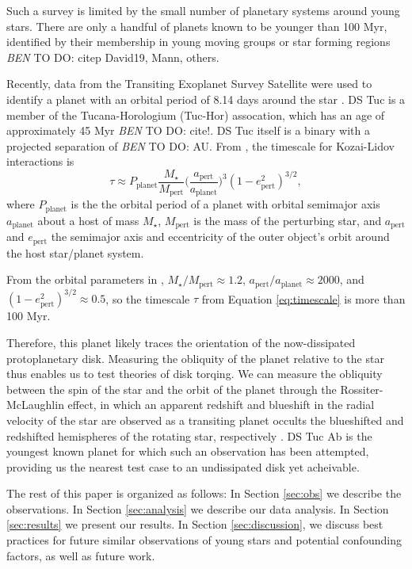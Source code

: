\documentclass[twocolumn]{aastex63}
\newcommand{\todo}[3]{{\color{#2} \emph{#1} TO DO: #3}}
\newcommand{\btmtodo}[1]{\todo{BEN}{blue}{#1}}
\begin{document}
Such a survey is limited by the small number of planetary systems around young stars. There are only a handful of planets known to be younger than 100 Myr, identified by their membership in young moving groups or star forming regions \btmtodo{citep David19, Mann, others}.

Recently, data from the Transiting Exoplanet Survey Satellite \citep{Ricker14} were used to identify a planet with an orbital period of 8.14 days around the star  \citep{Benatti19, Newton19}. 
DS Tuc is a member of the Tucana-Horologium (Tuc-Hor) assocation, which has an age of approximately 45 Myr \btmtodo{cite!}. 
DS Tuc itself is a binary with a projected separation of \btmtodo{AU}. 
From \citet{Holman97}, the timescale for Kozai-Lidov interactions is
\begin{equation}
    \tau \approx P_\textrm{planet} \frac{M_\star}{M_\textrm{pert}} \bigg(\frac{a_\textrm{pert}}{a_\textrm{planet}}\bigg)^3 (1-e^2_\textrm{pert})^{3/2},
\label{eq:timescale}
\end{equation}
where $P_\textrm{planet}$ is the the orbital period of a planet with orbital semimajor axis  $a_\textrm{planet}$ about a host of mass $M_\star$, $M_\textrm{pert}$ is the
mass of the perturbing star, and $a_\textrm{pert}$ and $e_\textrm{pert}$ the semimajor axis and eccentricity of the outer object's orbit around the host star/planet system.

From the orbital parameters in \citet{Newton19}, ${M_\star}/{M_\textrm{pert}} \approx 1.2$, ${a_\textrm{pert}}/{a_\textrm{planet}} \approx 2000$, and $(1-e^2_\textrm{pert})^{3/2} \approx 0.5$, so the timescale $\tau$ from Equation \ref{eq:timescale} is more than 100 Myr. 

Therefore, this planet likely traces the orientation of the now-dissipated protoplanetary disk. 
Measuring the obliquity of the planet relative to the star thus enables us to test theories of disk torqing.
We can measure the obliquity between the spin of the star and the orbit of the planet through the Rossiter-McLaughlin effect, in which an apparent redshift and blueshift in the radial velocity of the star are observed as a transiting planet occults the blueshifted and redshifted hemispheres of the rotating star, respectively \citep{Rossiter24, McLaughlin24}.
DS Tuc Ab is the youngest known planet for which such an observation has been attempted, providing us the nearest test case to an undissipated disk yet acheivable.


The rest of this paper is organized as follows:
In Section \ref{sec:obs} we describe the observations.
In Section \ref{sec:analysis} we describe our data analysis.
In Section \ref{sec:results} we present our results.
In Section \ref{sec:discussion}, we discuss best practices for future similar observations of young stars and potential confounding factors, as well as future work.
\end{document}
